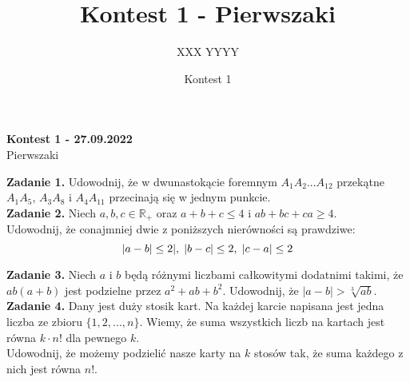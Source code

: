 \documentclass[zad,zawodnik,utf8]{sinol}
\title{Kontest 1 - Pierwszaki}
\author{XXX YYYY}
\date{Kontest 1}
\begin{document}
    \begin{center}
        \textbf{\huge Kontest 1 - 27.09.2022} \\ 
        \vspace{0.5cm}
        \Large{Pierwszaki}
    \end{center}
    \Large{
        \textbf{Zadanie 1.} Udowodnij, że w dwunastokącie foremnym $A_1 A_2 ... A_{12}$ przekątne $A_1 A_5$, $A_3 A_8$ i $A_4 A_{11}$ przecinają się w jednym punkcie. \\
        
        \textbf{Zadanie 2.} Niech $a,b,c \in \mathbb{R}_+$ oraz $a+b+c \leq 4$ i $ab+bc+ca\geq 4$. \\
        Udowodnij, że conajmniej dwie z poniższych nierówności są prawdziwe:
        $$|a-b|\leq 2|,\hspace{0.1cm} |b-c|\leq 2,\hspace{0.1cm} |c-a|\leq 2$$
        
        \textbf{Zadanie 3.}  Niech $a$ i $b$ będą różnymi liczbami całkowitymi dodatnimi takimi, że $ab(a+b)$ jest podzielne przez $a^2+ab+b^2$. Udowodnij, że $|a-b| > \sqrt[3]{ab}$. \\
        
        \textbf{Zadanie 4.} Dany jest duży stosik kart. Na każdej karcie napisana jest jedna liczba ze zbioru $\{1,2,...,n\}$. Wiemy, że suma wszystkich liczb na kartach jest równa $k \cdot n!$ dla pewnego $k$. \\ Udowodnij, że możemy podzielić nasze karty na $k$ stosów tak, że suma każdego z nich jest równa $n!$.
    }
\end{document}
